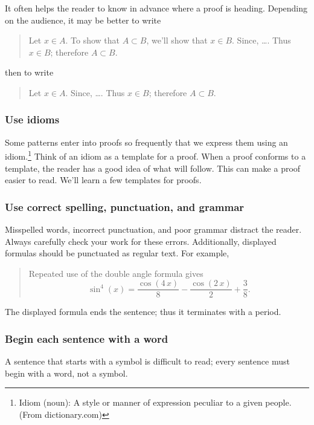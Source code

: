 \documentclass[12pt]{article}
\newcounter{ex}\setcounter{ex}{0}
\newcounter{id}\setcounter{id}{0}
\newcounter{se}\setcounter{se}{0}
\begin{document}
It often helps the reader to know in advance where a proof is heading.
Depending on the audience, it may be better to write

\begin{quote}
  Let $x \in A$.  To show that $ A \subset B$, we'll show that
  $x \in B$. Since, \dots. Thus $x \in B$; therefore $A \subset B$.
\end{quote}
then to write
\begin{quote}
  Let $x \in A$.  Since, \dots. Thus $x \in B$; therefore $A \subset B$.
\end{quote}

 \subsubsection{  Use idioms}

Some patterns enter into proofs so frequently that we express them
using an idiom.\footnote{Idiom (noun): A style or manner of expression
peculiar to a given people. (From dictionary.com)} Think of an idiom
as a template for a proof.  When a proof conforms to a template, the
reader has a good idea of what will follow.  This can make a proof easier to
read. We'll learn a few templates for proofs. 



 \subsubsection{  Use correct spelling, punctuation, and grammar}

Misspelled words, incorrect punctuation, and poor grammar distract the reader.  
Always carefully check your work for these errors. Additionally, 
displayed formulas should be punctuated as regular text.  For example,
\begin{quote}
Repeated use of the  double angle formula gives
\[
   \sin^4(x) = \frac {\cos \left(4\,x\right)}{8}-\frac {\cos \left(2\,x\right)}{2%
 }+\frac {3}{8}. 
\]
\end{quote}
The displayed formula ends the sentence; thus it terminates with a period.

 \subsubsection{  Begin each sentence with a word}  


A sentence that starts with a symbol is difficult to 
read; every sentence must begin with a word, not a symbol.
\end{document}
